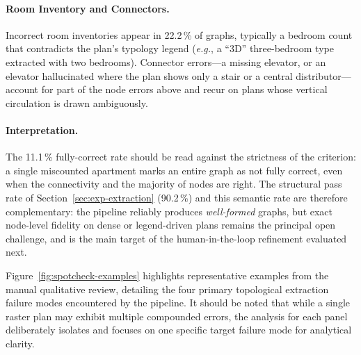 \documentclass[12pt,a4paper,openright]{report}
\newcommand{\eg}{\textit{e.g.}}
\begin{document}
\paragraph{Room Inventory and Connectors.} Incorrect room inventories appear in 22.2\,\% of graphs, typically a bedroom count that contradicts the plan's typology legend (\eg, a ``3D'' three-bedroom type extracted with two bedrooms). Connector errors---a missing elevator, or an elevator hallucinated where the plan shows only a stair or a central distributor---account for part of the node errors above and recur on plans whose vertical circulation is drawn ambiguously.

\paragraph{Interpretation.} The 11.1\,\% fully-correct rate should be read against the strictness of the criterion: a single miscounted apartment marks an entire graph as not fully correct, even when the connectivity and the majority of nodes are right. The structural pass rate of Section~\ref{sec:exp-extraction} (90.2\,\%) and this semantic rate are therefore complementary: the pipeline reliably produces \emph{well-formed} graphs, but exact node-level fidelity on dense or legend-driven plans remains the principal open challenge, and is the main target of the human-in-the-loop refinement evaluated next.

\vspace{8mm}
\noindent Figure~\ref{fig:spotcheck-examples} highlights representative examples from the manual qualitative review, detailing the four primary topological extraction failure modes encountered by the pipeline. It should be noted that while a single raster plan may exhibit multiple compounded errors, the analysis for each panel deliberately isolates and focuses on one specific target failure mode for analytical clarity.
\end{document}
